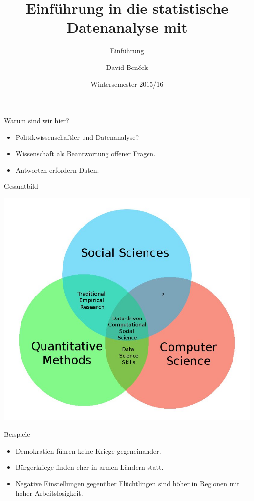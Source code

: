\documentclass[ignorenonframetext,]{beamer}
\title{Einführung in die statistische Datenanalyse mit \R{}}
\subtitle{Einführung}
\author{David Benček
}
\institute{}
\date{Wintersemester 2015/16}
\begin{document}
\frame{\titlepage}

\begin{frame}{Warum sind wir hier?}

\begin{itemize}
\itemsep1pt\parskip0pt
\item
  Politikwissenschaftler und Datenanalyse?
\item
  Wissenschaft als Beantwortung offener Fragen.
\item
  Antworten erfordern Daten.
\end{itemize}

\end{frame}

\begin{frame}{Gesamtbild}

\includegraphics{../fig/ccsvenn.jpeg}

\end{frame}

\begin{frame}{Beispiele}

\begin{itemize}
\itemsep1pt\parskip0pt
\item
  Demokratien führen keine Kriege gegeneinander.
\item
  Bürgerkriege finden eher in armen Ländern statt.
\item
  Negative Einstellungen gegenüber Flüchtlingen sind höher in Regionen
  mit hoher Arbeitslosigkeit.
\end{itemize}

\end{frame}
\end{document}
